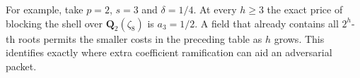 For example, take $p=2$, $s=3$ and $\delta=1/4$. At every $h\ge3$ the exact price of blocking the shell over $\mathbf Q_2(\zeta_8)$ is $a_3=1/2$. A field that already contains all $2^h$-th roots permits the smaller costs in the preceding table as $h$ grows. This identifies exactly where extra coefficient ramification can aid an adversarial packet.
